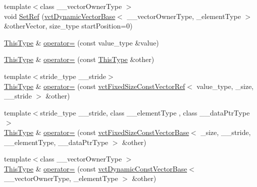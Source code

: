 \begin{DoxyCompactItemize}
\item 
{\footnotesize template$<$class \-\_\-\-\_\-vector\-Owner\-Type $>$ }\\void \hyperlink{classvct_fixed_size_vector_ref_a364a56cef34237c8cf3c82b3f80f2ec3}{Set\-Ref} (\hyperlink{classvct_dynamic_vector_base}{vct\-Dynamic\-Vector\-Base}$<$ \-\_\-\-\_\-vector\-Owner\-Type, \-\_\-element\-Type $>$ \&other\-Vector, size\-\_\-type start\-Position=0)
\item 
\hyperlink{classvct_fixed_size_vector_ref_a3fc8fbdfc7492a38119e7ed7ef5bc289}{This\-Type} \& \hyperlink{classvct_fixed_size_vector_ref_a45f99030a632daf58a5543977ff17aba}{operator=} (const value\-\_\-type \&value)
\end{DoxyCompactItemize}
{\bf }\par
\begin{DoxyCompactItemize}
\item 
\hyperlink{classvct_fixed_size_vector_ref_a3fc8fbdfc7492a38119e7ed7ef5bc289}{This\-Type} \& \hyperlink{classvct_fixed_size_vector_ref_ab2d0dcf4d1ca09ec99ec3adc8d90336f}{operator=} (const \hyperlink{classvct_fixed_size_vector_ref_a3fc8fbdfc7492a38119e7ed7ef5bc289}{This\-Type} \&other)
\item 
{\footnotesize template$<$stride\-\_\-type \-\_\-\-\_\-stride$>$ }\\\hyperlink{classvct_fixed_size_vector_ref_a3fc8fbdfc7492a38119e7ed7ef5bc289}{This\-Type} \& \hyperlink{classvct_fixed_size_vector_ref_a221b35a3d4438dce9d039ff271912925}{operator=} (const \hyperlink{classvct_fixed_size_const_vector_ref}{vct\-Fixed\-Size\-Const\-Vector\-Ref}$<$ value\-\_\-type, \-\_\-size, \-\_\-\-\_\-stride $>$ \&other)
\item 
{\footnotesize template$<$stride\-\_\-type \-\_\-\-\_\-stride, class \-\_\-\-\_\-element\-Type , class \-\_\-\-\_\-data\-Ptr\-Type $>$ }\\\hyperlink{classvct_fixed_size_vector_ref_a3fc8fbdfc7492a38119e7ed7ef5bc289}{This\-Type} \& \hyperlink{classvct_fixed_size_vector_ref_a20f94dc48a46c8c16917fd7ef9f1c92c}{operator=} (const \hyperlink{classvct_fixed_size_const_vector_base}{vct\-Fixed\-Size\-Const\-Vector\-Base}$<$ \-\_\-size, \-\_\-\-\_\-stride, \-\_\-\-\_\-element\-Type, \-\_\-\-\_\-data\-Ptr\-Type $>$ \&other)
\item 
{\footnotesize template$<$class \-\_\-\-\_\-vector\-Owner\-Type $>$ }\\\hyperlink{classvct_fixed_size_vector_ref_a3fc8fbdfc7492a38119e7ed7ef5bc289}{This\-Type} \& \hyperlink{classvct_fixed_size_vector_ref_a86365b66c5e71f8e06a2737d856e0802}{operator=} (const \hyperlink{classvct_dynamic_const_vector_base}{vct\-Dynamic\-Const\-Vector\-Base}$<$ \-\_\-\-\_\-vector\-Owner\-Type, \-\_\-element\-Type $>$ \&other)
\end{DoxyCompactItemize}


